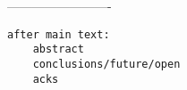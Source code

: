 -------------------------

\begin{verbatim}
after main text:
    abstract
    conclusions/future/open
    acks
\end{verbatim}

